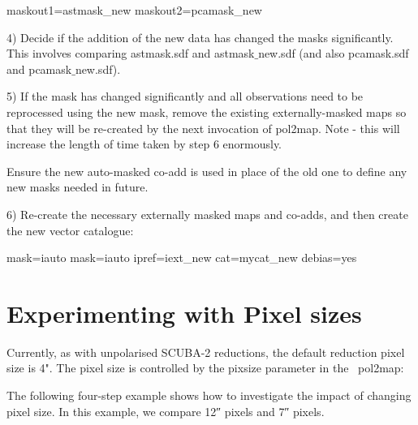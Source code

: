 \begin{terminalv}
maskout1=astmask_new           maskout2=pcamask_new
\end{terminalv}


4) Decide if the addition of the new data has changed the masks significantly. This involves
comparing astmask.sdf and astmask$\_$new.sdf (and also pcamask.sdf and
pcamask$\_$new.sdf).


5) If the mask has changed significantly and all observations need to be reprocessed 
using the new mask, remove the existing externally-masked
maps so that they will be re-created by the next invocation of pol2map.  Note - this will
increase the length of time taken by step 6 enormously.

Ensure the new auto-masked co-add is used in place of the old one to define any new masks needed in future.

\begin{terminalv}
\end{terminalv}

6) Re-create the necessary externally masked maps and co-adds, and then create the new
vector catalogue:

\begin{terminalv}
     mask=iauto
     mask=iauto ipref=iext_new cat=mycat_new debias=yes
\end{terminalv}

\section{Experimenting with Pixel sizes}

Currently, as with unpolarised SCUBA-2 reductions, the default reduction pixel size is 4".
The pixel size is controlled by the pixsize parameter in the \smurf\ pol2map:

\begin{terminalv}
\end{terminalv}


The following four-step example shows how to investigate the impact of changing pixel size.
In this example, we compare 12\si{\arcsecond} pixels and 7\si{\arcsecond} pixels.


